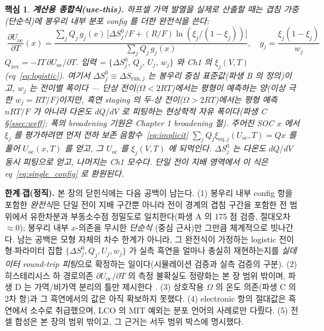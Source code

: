 \documentclass[11pt,a4paper]{article}
\newtheorem*{keybox}{핵심}
\newcommand{\rxn}{\mathrm{rxn}}
\newcommand{\eq}{\mathrm{eq}}
\newcommand{\rev}{\mathrm{rev}}
\newcommand{\oc}{\mathrm{oc}}
\begin{document}
\begin{keybox}
\textbf{계산용 종합식(use-this).} 하프셀 가역 발열을 실제로 산출할 때는 겹침 가중(단순식)에 봉우리 내부 분포
config 를 더한 \emph{완전식}을 쓴다:
\[
\boxed{\;\frac{\partial U_\oc}{\partial T}(x)
=\frac{\sum_j Q_j\,g_j(x)\,\bigl[\Delta S^0_j/F+(R/F)\ln(\xi_j/(1-\xi_j))\bigr]}{\sum_j Q_j\,g_j(x)},\quad
g_j=\frac{\xi_j(1-\xi_j)}{w_j}\;}
\]
$\dot Q_\rev=-IT\,\partial U_\oc/\partial T$. \emph{입력} = $\{\Delta S^0_j,\,Q_j,\,U_j,\,w_j\}$ 와 Ch1 의
$\xi_j(V,T)$(eq~\eqref{eq:logistic}). 여기서 $\Delta S^0_j\equiv\Delta S_{\rxn,j}$ 는 봉우리 중심 표준값(파생 B 의
정의)이고, $w_j$ 는 전이별 폭이다 — \emph{단상} 전이($\Omega<2RT$)에서는 평형이 예측하는 양(이상 극한
$w_j=RT/F$)이지만, 흑연 staging 의 \emph{두-상} 전이($\Omega>2RT$)에서는 평형 예측 $nRT/F$ 가 아니라 다온도
$dQ/dV$ 로 \emph{피팅하는 현상학적 자유 폭}이다(파생 C \S\ref{ssec:weff}; 폭의 broadening 기원은 Chapter 1
broadening 절). 주어진 SOC $x$ 에서 $\xi_j$ 를 평가하려면 먼저 전하 보존
음함수~\eqref{eq:implicit} $\sum_j Q_j\xi_{\eq,j}(U_\oc,T)=Qx$ 를 풀어 $U_\oc(x,T)$ 를 얻고, 그 $U_\oc$ 를
$\xi_j(V,T)$ 에 되먹인다. $\Delta S^0_j$ 는 다온도 $dQ/dV$ 동시 피팅으로 얻고, 나머지는 Ch1 모수다.
단일 전이 지배 영역에서 이 식은 eq~\eqref{eq:single_config} 로 환원된다.
\end{keybox}

\textbf{한계$\cdot$갭(정직).} 본 장의 닫힌식에는 다음 공백이 남는다. (1) 봉우리 내부 config 항을 포함한
\emph{완전식}은 단일 전이 지배 구간뿐 아니라 전이 경계의 겹침 구간을 포함한 전 범위에서 유한차분과 부동소수점
정밀도로 일치한다(파생 A 의 175 점 검증, 절대오차 $\approx0$); 봉우리 내부 $x$-의존을 무시한 \emph{단순식}
(중심 근사)만 그만큼 체계적으로 빗나간다. 남는 공백은
모형 자체의 차수 한계가 아니라, 그 완전식이 가정하는 logistic 전이형$\cdot$파라미터 집합 $\{\Delta S^0_j,Q_j,U_j,w_j\}$
가 실측 흑연을 얼마나 충실히 재현하는지를 \emph{실데이터 round-trip 피팅}으로 확정하는 일이다(시뮬레이션 검증과
실측 검증의 구분). (2) 히스테리시스 하 경로의존 $\partial U_\oc/\partial T$ 의 측정 불확실도
정량화는 본 장 범위 밖이며, 파생 D 는 가역/비가역 분리의 틀만 제시한다 \cite{hysteresis2018}. (3) 상호작용
$\Omega$ 의 온도 의존(파생 C 의 2차 항)과 그 흑연에서의 값은 아직 확보하지 못했다. (4) electronic 항의 절대값은
흑연에서 소수로 취급했으며, LCO 의 MIT 예외는 분포 언어의 사례로만 다뤘다. (5) 전셀 합성은 본 장의 범위
밖이고, 그 근거는 서두 범위 박스에 명시했다.
\end{document}
